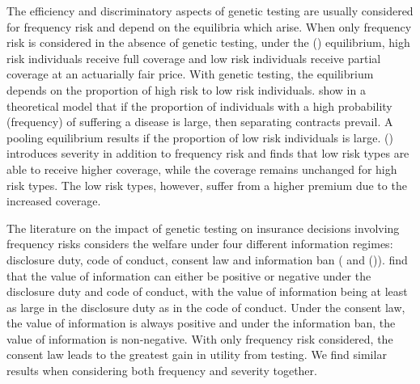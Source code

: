 \documentclass[natbib=false,preprint,12pt]{elsarticle}
\theoremstyle{plain}
\theoremstyle{definition}
\theoremstyle{plain}
\theoremstyle{TheoremNum}
\theoremstyle{CorollaryNum}
\theoremstyle{PropositionNum}
\theoremstyle{TheoremNum}
\begin{document}
The efficiency and discriminatory aspects of genetic testing are usually considered for frequency risk and depend on the equilibria which arise. When only frequency risk is considered in the absence of genetic testing, under the \citeauthor{rothschild1978equilibrium} (\citeyear{rothschild1978equilibrium}) equilibrium, high risk individuals receive full coverage and low risk individuals receive partial coverage at an actuarially fair price. With genetic testing, the equilibrium depends on the proportion of high risk to low risk individuals. \textcite{hoy2003impact} show in a theoretical model that if the proportion of individuals with a high probability (frequency) of suffering a disease is large, then separating contracts prevail. A pooling equilibrium results if the proportion of low risk individuals is large. \citeauthor{doherty1995severity} (\citeyear{doherty1995severity}) introduces severity in addition to frequency risk and finds that low risk types are able to receive higher coverage, while the coverage remains unchanged for high risk types. The low risk types, however, suffer from a higher premium due to the increased coverage. 

The literature on the impact of genetic testing on insurance decisions involving frequency risks considers the welfare under four different information regimes: disclosure duty, code of conduct, consent law and information ban (\textcite{barigozzi2011genetic} and
\citeauthor*{peter2017endogenous} (\citeyear{peter2017endogenous})). \textcite{barigozzi2011genetic} find that the value of information can either be positive or negative under the disclosure duty and code of conduct, with the value of information being at least as large in the disclosure duty as in the code of conduct. Under the consent law, the value of information is always positive and under the information ban, the value of information is non-negative. With only frequency risk considered, the consent law leads to the greatest gain in utility from testing. We find similar results when considering both frequency and severity together. 
\end{document}
